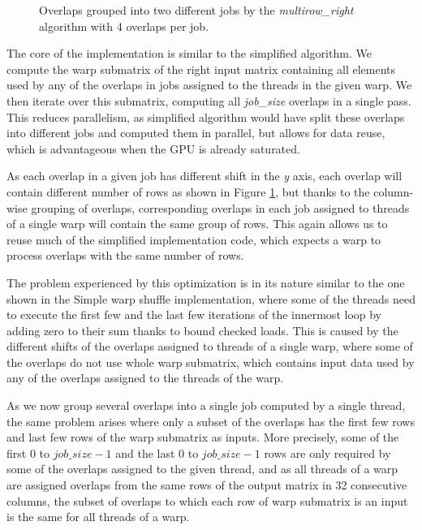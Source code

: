 \begin{figure}[ht]
	\centering
	\def\svgwidth{0.6\textwidth}
	\fontsize{6}{8}\selectfont
	
	\caption{Overlaps grouped into two different jobs by the \textit{multirow\_right} algorithm with 4 overlaps per job.}
	\label{fig:multirow_shifts}
\end{figure}

The core of the implementation is similar to the simplified algorithm. We compute the warp submatrix of the right input matrix containing all elements used by any of the overlaps in jobs assigned to the threads in the given warp. We then iterate over this submatrix, computing all \textit{job\_size} overlaps in a single pass. This reduces parallelism, as simplified algorithm would have split these overlaps into different jobs and computed them in parallel, but allows for data reuse, which is advantageous when the GPU is already saturated.

As each overlap in a given job has different shift in the \textit{y} axis, each overlap will contain different number of rows as shown in Figure \ref{fig:multirow_shifts}, but thanks to the column-wise grouping of overlaps, corresponding overlaps in each job assigned to threads of a single warp will contain the same group of rows. This again allows us to reuse much of the simplified implementation code, which expects a warp to process overlaps with the same number of rows.

The problem experienced by this optimization is in its nature similar to the one shown in the Simple warp shuffle implementation, where some of the threads need to execute the first few and the last few iterations of the innermost loop by adding zero to their sum thanks to bound checked loads. This is caused by the different shifts of the overlaps assigned to threads of a single warp, where some of the overlaps do not use whole warp submatrix, which contains input data used by any of the overlaps assigned to the threads of the warp.

As we now group several overlaps into a single job computed by a single thread, the same problem arises where only a subset of the overlaps has the first few rows and last few rows of the warp submatrix as inputs. More precisely, some of the first $0$ to $job\_size - 1$ and the last $0$ to $job\_size - 1$ rows are only required by some of the overlaps assigned to the given thread, and as all threads of a warp are assigned overlaps from the same rows of the output matrix in 32 consecutive columns, the subset of overlaps to which each row of warp submatrix is an input is the same for all threads of a warp.

